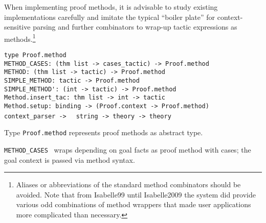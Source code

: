 \begin{isabellebody}
\begin{isamarkuptext}
\begin{enumerate}
  \end{enumerate}

  When implementing proof methods, it is advisable to study existing
  implementations carefully and imitate the typical ``boiler plate''
  for context-sensitive parsing and further combinators to wrap-up
  tactic expressions as methods.\footnote{Aliases or abbreviations of
  the standard method combinators should be avoided.  Note that from
  Isabelle99 until Isabelle2009 the system did provide various odd
  combinations of method wrappers that made user applications more
  complicated than necessary.}%
\end{isamarkuptext}%
\isamarkuptrue%
%
\isadelimmlref
%
\endisadelimmlref
%
\isatagmlref
%
\begin{isamarkuptext}%
\begin{mldecls}
  \verb|type Proof.method| \\
  \verb|METHOD_CASES: (thm list -> cases_tactic) -> Proof.method| \\
  \verb|METHOD: (thm list -> tactic) -> Proof.method| \\
  \verb|SIMPLE_METHOD: tactic -> Proof.method| \\
  \verb|SIMPLE_METHOD': (int -> tactic) -> Proof.method| \\
  \verb|Method.insert_tac: thm list -> int -> tactic| \\
  \verb|Method.setup: binding -> (Proof.context -> Proof.method) context_parser ->|\isasep\isanewline%
\verb|  string -> theory -> theory| \\
  \end{mldecls}

  \begin{description}

  \item Type \verb|Proof.method| represents proof methods as
  abstract type.

  \item \verb|METHOD_CASES|~ wraps
   depending on goal facts as proof method with
  cases; the goal context is passed via method syntax.


\end{description}
\end{isamarkuptext}
\end{isabellebody}
